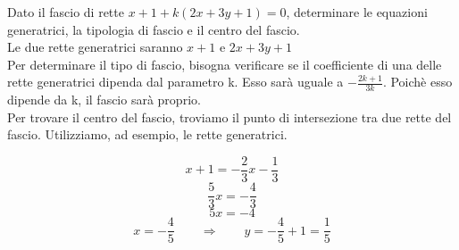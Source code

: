 \documentclass[10pt,a4paper]{article}
\begin{document}
Dato il fascio di rette $x+1 + k(2x+3y+1) = 0$, determinare le equazioni generatrici, la tipologia di fascio e il centro del fascio.\\

Le due rette generatrici saranno $x+1$ e $2x+3y+1$\\

Per determinare il tipo di fascio, bisogna verificare se il coefficiente di una delle rette generatrici dipenda dal parametro k. Esso sarà uguale a $-\frac{2k+1}{3k}$. Poichè esso dipende da k, il fascio sarà proprio.\\

Per trovare il centro del fascio, troviamo il punto di intersezione tra due rette del fascio. Utilizziamo, ad esempio, le rette generatrici.

$$x+1 = -\frac{2}{3}x -\frac{1}{3}$$
$$\frac{5}{3}x = -\frac{4}{3}$$
$$5x = -4$$
$$x= -\frac{4}{5}  \qquad \Rightarrow \qquad y= -\frac{4}{5} + 1= \frac{1}{5}$$
	
\end{document}
